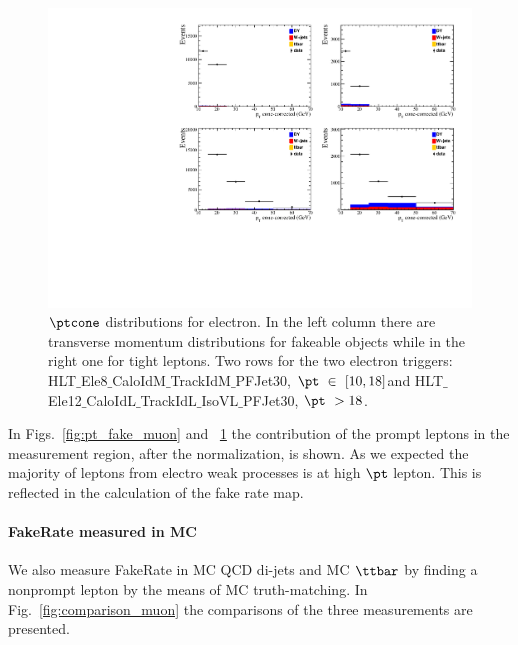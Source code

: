 \begin{figure}[h!]
\centering
\includegraphics[width=.7\textwidth]{Figures/c5/FAKE/pt_cone_ele.pdf}
\caption{$\ptcone$ distributions for electron. In the left column there are transverse momentum distributions for fakeable objects while in the right one for tight leptons. Two rows for the two electron triggers:
  HLT$\_$Ele8$\_$CaloIdM$\_$TrackIdM$\_$PFJet30, $\pt \ \in \ [10,18]$\GeV and HLT$\_$Ele12$\_$CaloIdL$\_$TrackIdL$\_$IsoVL$\_$PFJet30, $\pt \ > 18$\GeV.}
\label{fig:pt_fake_ele}
\end{figure}

In Figs.~\ref{fig:pt_fake_muon} and ~\ref{fig:pt_fake_ele} the
contribution of the prompt leptons in the measurement region, after
the normalization, is shown. As we expected the majority of leptons from electro weak processes is at high $\pt$ lepton. This is
reflected in the calculation of the fake rate map.

\paragraph{FakeRate measured in MC}
We also measure FakeRate in MC QCD di-jets and MC $\ttbar$ by finding a nonprompt lepton by the means of MC truth-matching. In Fig.~\ref{fig:comparison_muon} the comparisons of the three measurements are presented.

